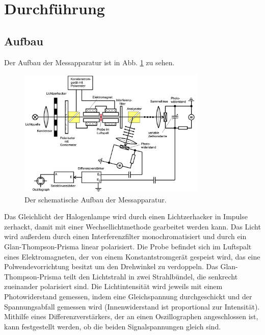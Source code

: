 \section{Durchführung}
\label{sec:Durchführung}

\subsection{Aufbau}
Der Aufbau der Messapparatur ist in Abb. \ref{fig:Aufbau} zu sehen.
\begin{figure}
    \centering
    \includegraphics[width=0.8\textwidth]{fotos/Aufbau.png}
    \caption{Der schematische Aufbau der Messapparatur. \cite{V46}}
    \label{fig:Aufbau}
\end{figure}
Das Gleichlicht der Halogenlampe wird durch einen Lichtzerhacker in Impulse zerhackt, damit mit einer Wechsellichtmethode gearbeitet werden kann. Das Licht wird außerdem durch einen Interferenzfilter monochromatisiert und durch ein Glan-Thompson-Prisma linear polarisiert. Die Probe befindet sich im Luftspalt eines Elektromagneten, der von einem Konstantstromgerät gespeist wird, das eine Polwendevorrichtung besitzt um den Drehwinkel zu verdoppeln. Das Glan-Thompson-Prisma teilt den Lichtstrahl in zwei Strahlbündel, die senkrecht zueinander polarisiert sind. Die Lichtintensität wird jeweils mit einem Photowiderstand gemessen, indem eine Gleichspannung durchgeschickt und der Spannungsabfall gemessen wird (Innenwiderstand ist proportional zur Intensität). Mithilfe eines Differenzverstärkers, der an einen Oszillographen angeschlossen ist, kann festgestellt werden, ob die beiden Signalspannungen gleich sind.

